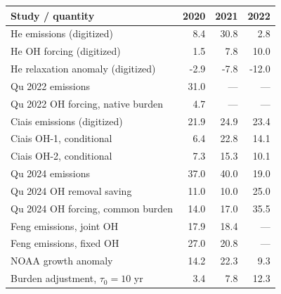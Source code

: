 \begin{tabular}{lrrr}
\toprule Study / quantity & 2020 & 2021 & 2022 \\
\midrule
He emissions (digitized) & 8.4 & 30.8 & 2.8 \\
He OH forcing (digitized) & 1.5 & 7.8 & 10.0 \\
He relaxation anomaly (digitized) & -2.9 & -7.8 & -12.0 \\
Qu 2022 emissions & 31.0 & --- & --- \\
Qu 2022 OH forcing, native burden & 4.7 & --- & --- \\
Ciais emissions (digitized) & 21.9 & 24.9 & 23.4 \\
Ciais OH-1, conditional & 6.4 & 22.8 & 14.1 \\
Ciais OH-2, conditional & 7.3 & 15.3 & 10.1 \\
Qu 2024 emissions & 37.0 & 40.0 & 19.0 \\
Qu 2024 OH removal saving & 11.0 & 10.0 & 25.0 \\
Qu 2024 OH forcing, common burden & 14.0 & 17.0 & 35.5 \\
Feng emissions, joint OH & 17.9 & 18.4 & --- \\
Feng emissions, fixed OH & 27.0 & 20.8 & --- \\
NOAA growth anomaly & 14.2 & 22.3 & 9.3 \\
Burden adjustment, $\tau_0=10$ yr & 3.4 & 7.8 & 12.3 \\
\bottomrule
\end{tabular}
